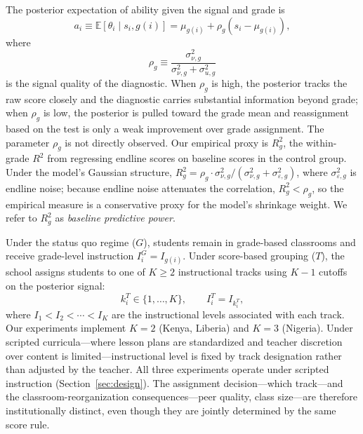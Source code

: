 \documentclass[11pt]{article}
\newcommand{\E}{\mathbb{E}}
\begin{document}
The posterior expectation of ability given the signal and grade is
\begin{equation}
\label{eq:posterior}
a_i \equiv \E[\theta_i \mid s_i, g(i)] = \mu_{g(i)} + \rho_g(s_i - \mu_{g(i)}),
\end{equation}
where
\begin{equation}
\label{eq:signal_quality}
\rho_g \equiv \frac{\sigma^2_{\nu,g}}{\sigma^2_{\nu,g} + \sigma^2_{u,g}}
\end{equation}
is the signal quality of the diagnostic. When $\rho_g$ is high, the posterior tracks the raw score closely and the diagnostic carries substantial information beyond grade; when $\rho_g$ is low, the posterior is pulled toward the grade mean and reassignment based on the test is only a weak improvement over grade assignment. The parameter $\rho_g$ is not directly observed. Our empirical proxy is $R^2_g$, the within-grade $R^2$ from regressing endline scores on baseline scores in the control group. Under the model's Gaussian structure, $R^2_g = \rho_g \cdot \sigma^2_{\nu,g}/(\sigma^2_{\nu,g} + \sigma^2_{\varepsilon,g})$, where $\sigma^2_{\varepsilon,g}$ is endline noise; because endline noise attenuates the correlation, $R^2_g < \rho_g$, so the empirical measure is a conservative proxy for the model's shrinkage weight. We refer to $R^2_g$ as \emph{baseline predictive power}.

Under the status quo regime ($G$), students remain in grade-based classrooms and receive grade-level instruction $I_i^G = I_{g(i)}$. Under score-based grouping ($T$), the school assigns students to one of $K \geq 2$ instructional tracks using $K-1$ cutoffs on the posterior signal:
\begin{equation}
k_i^T \in \{1, \ldots, K\}, \qquad I_i^T = I_{k_i^T},
\end{equation}
where $I_1 < I_2 < \cdots < I_K$ are the instructional levels associated with each track. Our experiments implement $K = 2$ (Kenya, Liberia) and $K = 3$ (Nigeria). Under scripted curricula---where lesson plans are standardized and teacher discretion over content is limited---instructional level is fixed by track designation rather than adjusted by the teacher. All three experiments operate under scripted instruction (Section~\ref{sec:design}). The assignment decision---which track---and the classroom-reorganization consequences---peer quality, class size---are therefore institutionally distinct, even though they are jointly determined by the same score rule.
\end{document}
